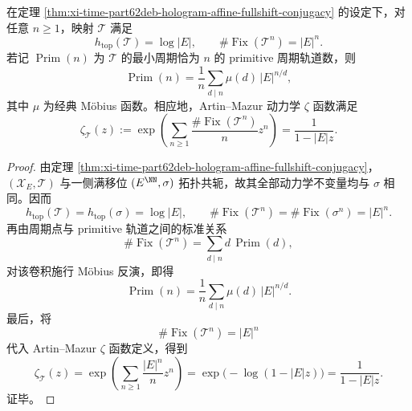 \begin{corollary}\label{cor:xi-time-part62deb-hologram-fullshift-entropy-primitive-zeta}
在定理 \ref{thm:xi-time-part62deb-hologram-affine-fullshift-conjugacy} 的设定下，对任意 \(n\ge 1\)，映射 \(\mathcal T\) 满足
\[
h_{\mathrm{top}}(\mathcal T)=\log |E|,
\qquad
\#\operatorname{Fix}(\mathcal T^n)=|E|^n.
\]
若记 \(\operatorname{Prim}(n)\) 为 \(\mathcal T\) 的最小周期恰为 \(n\) 的 primitive 周期轨道数，则
\[
\operatorname{Prim}(n)
=
\frac1n\sum_{d\mid n}\mu(d)\,|E|^{n/d},
\]
其中 \(\mu\) 为经典 Möbius 函数。相应地，Artin--Mazur 动力学 \(\zeta\) 函数满足
\[
\zeta_{\mathcal T}(z)
:=
\exp\!\left(
\sum_{n\ge 1}\frac{\#\operatorname{Fix}(\mathcal T^n)}{n}z^n
\right)
=
\frac{1}{1-|E|z}.
\]
\end{corollary}
\begin{proof}
由定理 \ref{thm:xi-time-part62deb-hologram-affine-fullshift-conjugacy}，\((\mathcal X_E,\mathcal T)\) 与一侧满移位 \((E^{\NN},\sigma)\) 拓扑共轭，故其全部动力学不变量均与 \(\sigma\) 相同。因而
\[
h_{\mathrm{top}}(\mathcal T)=h_{\mathrm{top}}(\sigma)=\log |E|,
\qquad
\#\operatorname{Fix}(\mathcal T^n)=\#\operatorname{Fix}(\sigma^n)=|E|^n.
\]
再由周期点与 primitive 轨道之间的标准关系
\[
\#\operatorname{Fix}(\mathcal T^n)=\sum_{d\mid n} d\,\operatorname{Prim}(d),
\]
对该卷积施行 Möbius 反演，即得
\[
\operatorname{Prim}(n)
=
\frac1n\sum_{d\mid n}\mu(d)\,|E|^{n/d}.
\]
最后，将
\[
\#\operatorname{Fix}(\mathcal T^n)=|E|^n
\]
代入 Artin--Mazur \(\zeta\) 函数定义，得到
\[
\zeta_{\mathcal T}(z)
=
\exp\!\left(\sum_{n\ge 1}\frac{|E|^n}{n}z^n\right)
=
\exp\!\bigl(-\log(1-|E|z)\bigr)
=
\frac{1}{1-|E|z}.
\]
证毕。
\end{proof}

\endinput

